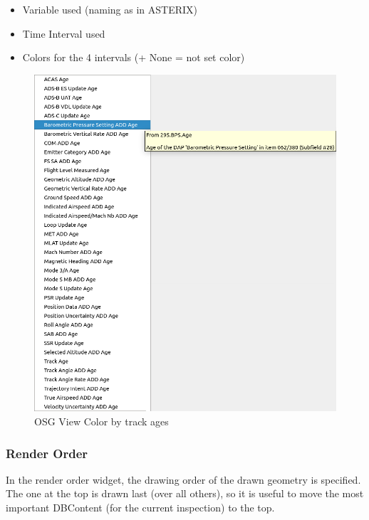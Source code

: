 \begin{itemize}
 \item Variable used (naming as in ASTERIX)
 \item Time Interval used
 \item Colors for the 4 intervals (+ None = not set color)
\end{itemize}

\begin{figure}[H]
    \hspace*{-1.5cm}
    \includegraphics[width=17cm,frame]{figures/osgview_style_track_ages.png}
  \caption{OSG View Color by track ages}
\end{figure}

\subsubsection{Render Order}

In the render order widget, the drawing order of the drawn geometry is specified. The one at the top is drawn last (over all others), so it is useful to move the most important DBContent (for the current inspection) to the top.

